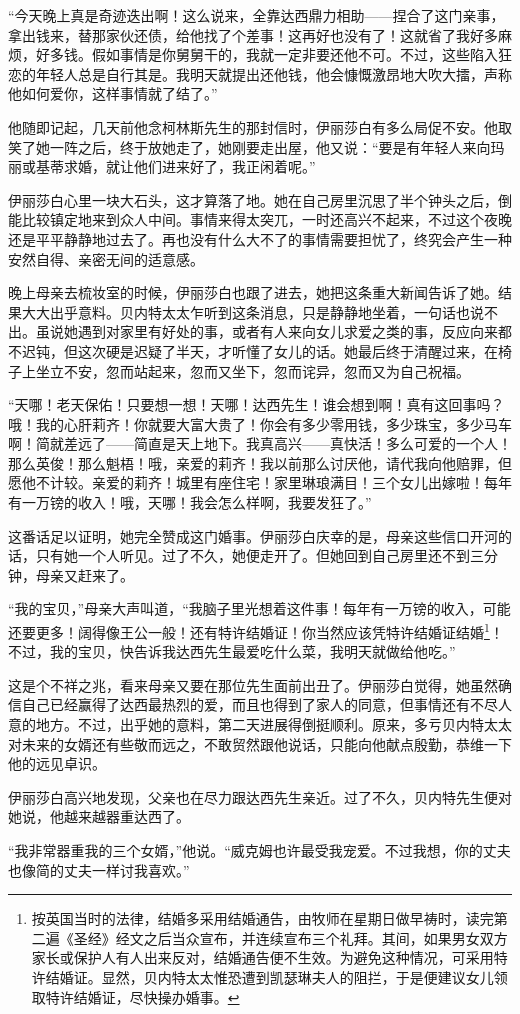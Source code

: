 \par “今天晚上真是奇迹迭出啊！这么说来，全靠达西鼎力相助——捏合了这门亲事，拿出钱来，替那家伙还债，给他找了个差事！这再好也没有了！这就省了我好多麻烦，好多钱。假如事情是你舅舅干的，我就一定非要还他不可。不过，这些陷入狂恋的年轻人总是自行其是。我明天就提出还他钱，他会慷慨激昂地大吹大擂，声称他如何爱你，这样事情就了结了。”
\par 他随即记起，几天前他念柯林斯先生的那封信时，伊丽莎白有多么局促不安。他取笑了她一阵之后，终于放她走了，她刚要走出屋，他又说：“要是有年轻人来向玛丽或基蒂求婚，就让他们进来好了，我正闲着呢。”
\par 伊丽莎白心里一块大石头，这才算落了地。她在自己房里沉思了半个钟头之后，倒能比较镇定地来到众人中间。事情来得太突兀，一时还高兴不起来，不过这个夜晚还是平平静静地过去了。再也没有什么大不了的事情需要担忧了，终究会产生一种安然自得、亲密无间的适意感。
\par 晚上母亲去梳妆室的时候，伊丽莎白也跟了进去，她把这条重大新闻告诉了她。结果大大出乎意料。贝内特太太乍听到这条消息，只是静静地坐着，一句话也说不出。虽说她遇到对家里有好处的事，或者有人来向女儿求爱之类的事，反应向来都不迟钝，但这次硬是迟疑了半天，才听懂了女儿的话。她最后终于清醒过来，在椅子上坐立不安，忽而站起来，忽而又坐下，忽而诧异，忽而又为自己祝福。
\par “天哪！老天保佑！只要想一想！天哪！达西先生！谁会想到啊！真有这回事吗？哦！我的心肝莉齐！你就要大富大贵了！你会有多少零用钱，多少珠宝，多少马车啊！简就差远了——简直是天上地下。我真高兴——真快活！多么可爱的一个人！那么英俊！那么魁梧！哦，亲爱的莉齐！我以前那么讨厌他，请代我向他赔罪，但愿他不计较。亲爱的莉齐！城里有座住宅！家里琳琅满目！三个女儿出嫁啦！每年有一万镑的收入！哦，天哪！我会怎么样啊，我要发狂了。”
\par 这番话足以证明，她完全赞成这门婚事。伊丽莎白庆幸的是，母亲这些信口开河的话，只有她一个人听见。过了不久，她便走开了。但她回到自己房里还不到三分钟，母亲又赶来了。
\par “我的宝贝，”母亲大声叫道，“我脑子里光想着这件事！每年有一万镑的收入，可能还要更多！阔得像王公一般！还有特许结婚证！你当然应该凭特许结婚证结婚\footnote{按英国当时的法律，结婚多采用结婚通告，由牧师在星期日做早祷时，读完第二遍《圣经》经文之后当众宣布，并连续宣布三个礼拜。其间，如果男女双方家长或保护人有人出来反对，结婚通告便不生效。为避免这种情况，可采用特许结婚证。显然，贝内特太太惟恐遭到凯瑟琳夫人的阻拦，于是便建议女儿领取特许结婚证，尽快操办婚事。}！不过，我的宝贝，快告诉我达西先生最爱吃什么菜，我明天就做给他吃。”
\par 这是个不祥之兆，看来母亲又要在那位先生面前出丑了。伊丽莎白觉得，她虽然确信自己已经赢得了达西最热烈的爱，而且也得到了家人的同意，但事情还有不尽人意的地方。不过，出乎她的意料，第二天进展得倒挺顺利。原来，多亏贝内特太太对未来的女婿还有些敬而远之，不敢贸然跟他说话，只能向他献点殷勤，恭维一下他的远见卓识。
\par 伊丽莎白高兴地发现，父亲也在尽力跟达西先生亲近。过了不久，贝内特先生便对她说，他越来越器重达西了。
\par “我非常器重我的三个女婿，”他说。“威克姆也许最受我宠爱。不过我想，你的丈夫也像简的丈夫一样讨我喜欢。”




